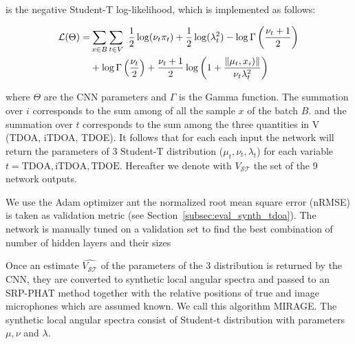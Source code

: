  is the negative Student-T log-likelihood, which is implemented as follows:

\begin{equation}
\begin{split}
\mathcal{L}(\Theta) =& \sum_{x \in B} \sum_{t \in V}\ \dfrac{1}{2} \log (\nu_t\pi_t)
                        + \dfrac{1}{2} \log(\lambda_t^2)
                        - \log  \Gamma \left( \dfrac{\nu_t+1}{2} \right)\\
                    &    + \log  \Gamma \left( \dfrac{\nu_t}{2} \right)
                        + \dfrac{\nu_t+1}{2}
                        \log \left( 1  + \dfrac{\norm{\mu_t, x_i)}}{\nu_t \lambda_t^2} \right)\\
\end{split}
\end{equation}

where $\Theta$ are the CNN parameters and $\Gamma$ is the Gamma function. The summation over $i$ corresponds to the sum among of all the sample $x$ of the batch $B$. and the summation over $t$ corresponds to the sum among the three quantities in V (TDOA, iTDOA, TDOE). It follows that for each each input the network will return the parameters of 3 Student-T distribution ($\mu_t, \nu_t, \lambda_t$) for each variable $t = { \text{TDOA}, \text{iTDOA}, \text{TDOE} }$. Hereafter we denote with $V_{\mathcal{ST}}$ the set of the 9 network outputs.

We use the Adam optimizer ant the normalized root mean square error (nRMSE) is taken as validation metric (see Section~\ref{subsec:eval_synth_tdoa}). The network is manually tuned on a validation set to find the best combination of number of hidden layers and their sizes

Once an estimate $\hat{V_\mathcal{ST}}$ of the parameters of the 3 distribution is returned by the CNN, they are converted to synthetic local angular spectra and passed to an SRP-PHAT method together with the relative positions of true and image microphones which are assumed known. We call this algorithm MIRAGE. The synthetic local angular spectra consist of Student-t distribution with parameters $\mu, \nu$ and $\lambda$.

